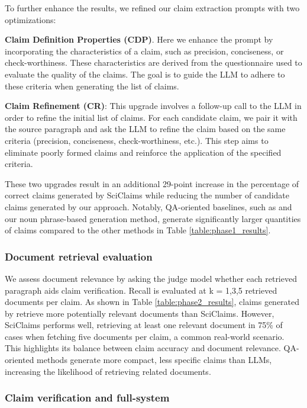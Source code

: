\documentclass[11pt]{article}
\begin{document}
To further enhance the results, we refined our claim extraction prompts with two optimizations:

\textbf{Claim Definition Properties (CDP)}. Here we enhance the prompt by incorporating the characteristics of a claim, such as precision, conciseness, or check-worthiness. These characteristics are derived from the questionnaire used to evaluate the quality of the claims. The goal is to guide the LLM to adhere to these criteria when generating the list of claims.

\textbf{Claim Refinement (CR)}: This upgrade involves a follow-up call to the LLM in order to refine the initial list of claims. For each candidate claim, we pair it with the source paragraph and ask the LLM to refine the claim based on the same criteria (precision, conciseness, check-worthiness, etc.). This step aims to eliminate poorly formed claims and reinforce the application of the specified criteria.

These two upgrades result in an additional 29-point increase in the percentage of correct claims generated by SciClaims while reducing the number of candidate claims generated by our approach. Notably, QA-oriented baselines, such as \cite{wright-etal-2022-generating} and our noun phrase-based generation method, generate significantly larger quantities of claims compared to the other methods in Table \ref{table:phase1_results}.


\subsubsection{Document retrieval evaluation}

We assess document relevance by asking the judge model whether each retrieved paragraph aids claim verification. Recall is evaluated at k = {1,3,5} retrieved documents per claim. As shown in Table \ref{table:phase2_results}, claims generated by \cite{wright-etal-2022-generating} retrieve more potentially relevant documents than SciClaims. However, SciClaims performs well, retrieving at least one relevant document in 75\% of cases when fetching five documents per claim, a common real-world scenario. This highlights its balance between claim accuracy and document relevance. QA-oriented methods generate more compact, less specific claims than LLMs, increasing the likelihood of retrieving related documents.

\subsubsection{Claim verification and full-system}
\end{document}
